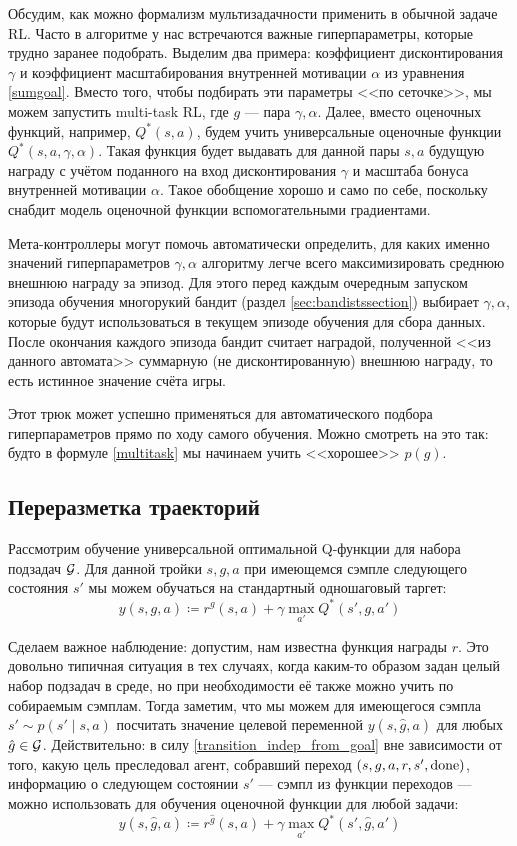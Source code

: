 Обсудим, как можно формализм мультизадачности применить в обычной задаче RL. Часто в алгоритме у нас встречаются важные гиперпараметры, которые трудно заранее подобрать. Выделим два примера: коэффициент дисконтирования $\gamma$ и коэффициент масштабирования внутренней мотивации $\alpha$ из уравнения \eqref{sumgoal}. Вместо того, чтобы подбирать эти параметры <<по сеточке>>, мы можем запустить multi-task RL, где $g$ --- пара $\gamma, \alpha$. Далее, вместо оценочных функций, например, $Q^*(s, a)$, будем учить универсальные оценочные функции $Q^*(s, a, \gamma, \alpha)$. Такая функция будет выдавать для данной пары $s, a$ будущую награду с учётом поданного на вход дисконтирования $\gamma$ и масштаба бонуса внутренней мотивации $\alpha$. Такое обобщение хорошо и само по себе, поскольку снабдит модель оценочной функции вспомогательными градиентами.

Мета-контроллеры могут помочь автоматически определить, для каких именно значений гиперпараметров $\gamma, \alpha$ алгоритму легче всего максимизировать среднюю внешнюю награду за эпизод. Для этого перед каждым очередным запуском эпизода обучения многорукий бандит (раздел \ref{sec:bandistssection}) выбирает $\gamma, \alpha$, которые будут использоваться в текущем эпизоде обучения для сбора данных. После окончания каждого эпизода бандит считает наградой, полученной <<из данного автомата>> суммарную (не дисконтированную) внешнюю награду, то есть истинное значение счёта игры.

Этот трюк может успешно применяться для автоматического подбора гиперпараметров прямо по ходу самого обучения. Можно смотреть на это так: будто в формуле \eqref{multitask} мы начинаем учить <<хорошее>> $p(g)$.

\subsection{Переразметка траекторий}\label{subsec:hindsight}

Рассмотрим обучение универсальной оптимальной Q-функции для набора подзадач $\mathcal{G}$. Для данной тройки $s, g, a$ при имеющемся сэмпле следующего состояния $s'$ мы можем обучаться на стандартный одношаговый таргет:
$$y(s, g, a) \coloneqq r^g(s, a) + \gamma \max_{a'} Q^*(s', g, a')$$

Сделаем важное наблюдение: допустим, нам известна функция награды $r$. Это довольно типичная ситуация в тех случаях, когда каким-то образом задан целый набор подзадач в среде, но при необходимости её также можно учить по собираемым сэмплам. Тогда заметим, что мы можем для имеющегося сэмпла $s' \sim p(s' \mid s, a)$ посчитать значение целевой переменной $y(s, \hat{g}, a)$ для любых $\hat{g} \in \mathcal{G}$. Действительно: в силу \eqref{transition_indep_from_goal} вне зависимости от того, какую цель преследовал агент, собравший переход $(s, g, a, r, s', \mathrm{done})$, информацию о следующем состоянии $s'$ --- сэмпл из функции переходов --- можно использовать для обучения оценочной функции для любой задачи:
$$y(s, \hat{g}, a) \coloneqq r^{\hat{g}}(s, a) + \gamma \max_{a'} Q^*(s', \hat{g}, a')$$

